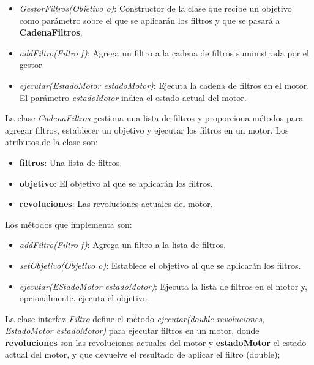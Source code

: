 \documentclass{article} %
\begin{document}
    \begin{itemize}
        \item \textit{GestorFiltros(Objetivo o)}: Constructor de la clase que recibe un objetivo como parámetro sobre el que se
                aplicarán los filtros y que se pasará a \textbf{CadenaFiltros}.
        \item \textit{addFiltro(Filtro f)}: Agrega un filtro a la cadena de filtros suministrada por el gestor.
        \item \textit{ejecutar(EstadoMotor estadoMotor)}: Ejecuta la cadena de filtros en el motor.
                El parámetro \textit{estadoMotor} indica el estado actual del motor.
    \end{itemize}

    \hspace*{1cm}La clase \textit{CadenaFiltros} gestiona una lista de filtros y proporciona métodos para agregar filtros, 
    establecer un objetivo y ejecutar los filtros en un motor. Los atributos de la clase son:

    \begin{itemize}
        \item \textbf{filtros}: Una lista de filtros.
        \item \textbf{objetivo}: El objetivo al que se aplicarán los filtros.
        \item \textbf{revoluciones}: Las revoluciones actuales del motor.
    \end{itemize}

    Los métodos que implementa son:

    \begin{itemize}
        \item \textit{addFiltro(Filtro f)}: Agrega un filtro a la lista de filtros.
        \item \textit{setObjetivo(Objetivo o)}: Establece el objetivo al que se aplicarán los filtros.
        \item \textit{ejecutar(EStadoMotor estadoMotor)}: Ejecuta la lista de filtros en el motor y, opcionalmente, ejecuta el objetivo.
    \end{itemize}

    \hspace*{1cm}La clase interfaz \textit{Filtro} define el método \textit{ejecutar(double revoluciones, EstadoMotor estadoMotor)} 
    para ejecutar filtros en un motor, donde \textbf{revoluciones} son las revoluciones actuales del motor y \textbf{estadoMotor}
    el estado actual del motor, y que devuelve el resultado de aplicar el filtro (double);
\end{document}
